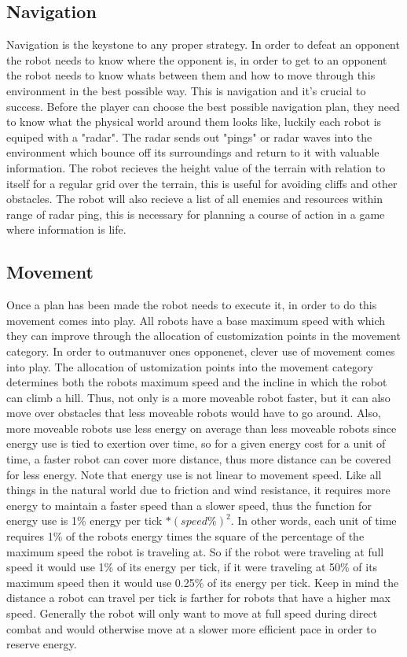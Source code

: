 \documentclass[a4paper]{article}
\begin{document}
\subsection{Navigation}

Navigation is the keystone to any proper strategy. In order to defeat an opponent the robot needs to know where the opponent is, in order to get to an opponent the robot needs to know whats between them and how to move through this environment in the best possible way. This is navigation and it's crucial to success. Before the player can choose the best possible navigation plan, they need to  know what the physical world around them looks like, luckily each robot is equiped with a "radar". The radar sends out "pings" or radar waves into the environment which bounce off its surroundings and return to it with valuable information. The robot recieves the height value of the terrain with relation to itself for a regular grid over the terrain, this is useful for avoiding cliffs and other obstacles. The robot will also recieve a list of all enemies and resources within range of radar ping, this is necessary for planning a course of action in a game where information is life.

\subsection{Movement}

Once a plan has been made the robot needs to execute it, in order to do this movement comes into play. All robots have a base maximum speed with which they can improve through the allocation of customization points in the movement category. In order to outmanuver ones opponenet, clever use of movement comes into play. The allocation of ustomization points into the movement category determines both the robots maximum speed and the incline in which the robot can climb a hill. Thus, not only is a more moveable robot faster, but it can also move over obstacles that less moveable robots would have to go around. Also, more moveable robots use less energy on average than less moveable robots since energy use is tied to exertion over time, so for a given energy cost for a unit of time, a faster robot can cover more distance, thus more distance can be covered for less energy. Note that energy use is not linear to movement speed. Like all things in the natural world due to friction and wind resistance, it requires more energy to maintain a faster speed than a slower speed, thus the function for energy use is 1\% energy per tick $*(speed\%)^2$. In other words, each unit of time requires 1\% of the robots energy times the square of the percentage of the maximum speed the robot is traveling at. So if the robot were traveling at full speed it would use 1\% of its energy per tick, if it were traveling at 50\% of its maximum speed then it would use 0.25\% of its energy per tick. Keep in mind the distance a robot can travel per tick is farther for robots that have a higher max speed. Generally the robot will only want to move at full speed during direct combat and would otherwise move at a slower more efficient pace in order to reserve energy. 
\end{document}
